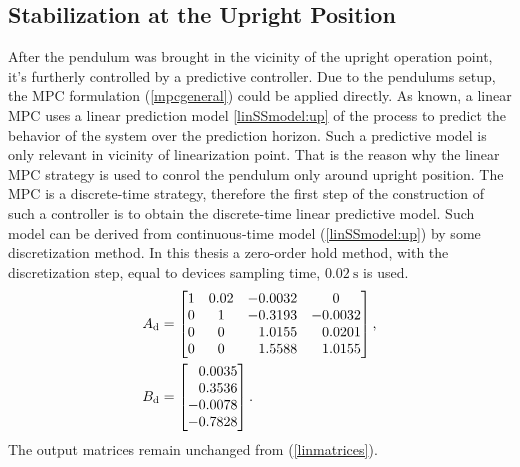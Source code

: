 \subsection{Stabilization at the Upright Position}
After the pendulum was brought in the vicinity of the upright operation point, it's furtherly controlled by a predictive controller. Due to the pendulums setup, the MPC formulation (\ref{mpcgeneral}) could be applied directly. As known, a linear MPC uses a linear prediction model \ref{linSSmodel:up} of the process to predict the behavior of the system over the prediction horizon. Such a predictive model is only relevant in vicinity of linearization point. That is the reason why the linear MPC strategy is used to conrol the pendulum only around upright position. 
The MPC is a discrete-time strategy, therefore the first step of the construction of such a controller is to obtain the discrete-time linear predictive model. Such model can be derived from continuous-time model (\ref{linSSmodel:up}) by some discretization method. In this thesis a zero-order hold method, with the discretization step, equal to devices sampling time, $\SI{0.02}{\second}$ is used. 
\begin{subequations}\label{dismatrices}
	\begin{align}
	A _{\text{d}} &=\begin{bmatrix}
	1&0.02&-0.0032& 0\\
	0&1&-0.3193&-0.0032\\
	0&0&\ \; \,1.0155&\ \; \,0.0201\\
	0&0&\ \; \,1.5588&\ \; \,1.0155
	\end{bmatrix},\\
	B _{\text{d}} &=\begin{bmatrix}
	\ \; \,0.0035\\
	\ \; \,0.3536\\
	-0.0078\\
	-0.7828
	\end{bmatrix}.
	\end{align}
\end{subequations}
The output matrices remain unchanged from (\ref{linmatrices}).\\ 

